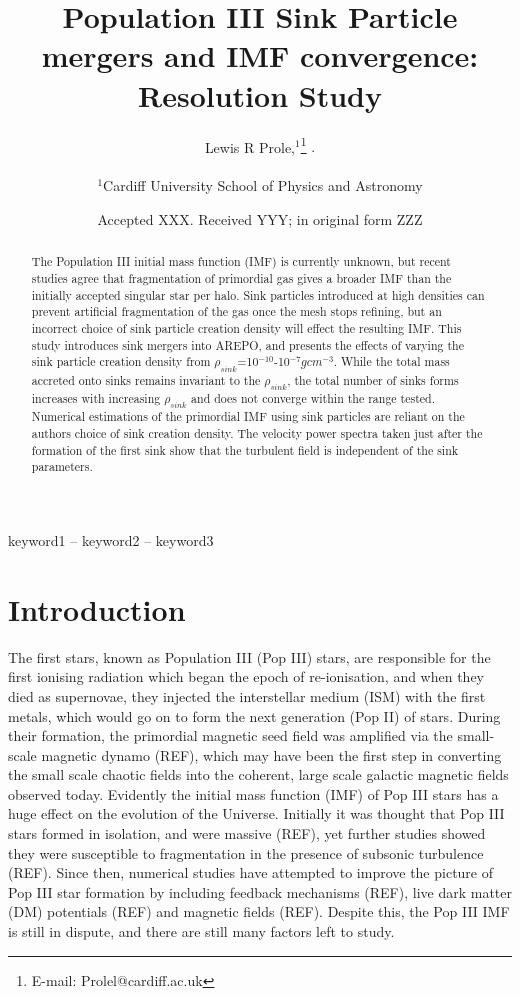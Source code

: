 \documentclass[fleqn,usenatbib]{mnras}
\title[Short title, max. 45 characters]{Population III Sink Particle mergers and IMF convergence: Resolution Study}
\author[L. R. Prole]{
Lewis R Prole,$^{1}$\thanks{E-mail: Prolel@cardiff.ac.uk}
$.$
$$
$$
\\
$^{1}$Cardiff University School of Physics and Astronomy\\
$$
$$
}
\date{Accepted XXX. Received YYY; in original form ZZZ}
\begin{document}
\label{firstpage}
\pagerange{\pageref{firstpage}--\pageref{lastpage}}
\maketitle

\begin{abstract}
The Population III initial mass function (IMF) is currently unknown, but recent studies agree that fragmentation of primordial gas gives a broader IMF than the initially accepted singular star per halo. Sink particles introduced at high densities can prevent artificial fragmentation of the gas once the mesh stops refining, but an incorrect choice of sink particle creation density will effect the resulting IMF. This study introduces sink mergers into AREPO, and presents the effects of varying the sink particle creation density from $\rho_{sink}$=10$^{-10}$-10$^{-7}gcm^{-3}$. While the total mass accreted onto sinks remains invariant to the $\rho_{sink}$, the total number of sinks forms increases with increasing $\rho_{sink}$ and does not converge within the range tested. Numerical estimations of the primordial IMF using sink particles are reliant on the authors choice of sink creation density. The velocity power spectra taken just after the formation of the first sink show that the turbulent field is independent of the sink parameters. 
\end{abstract}

\begin{keywords}
keyword1 -- keyword2 -- keyword3
\end{keywords}



\section{Introduction}
The first stars, known as Population III (Pop III) stars, are responsible for the first ionising radiation which began the epoch of re-ionisation, and when they died as supernovae, they injected the interstellar medium (ISM) with the first metals, which would go on to form the next generation (Pop II) of stars. During their formation, the primordial magnetic seed field was amplified via the small-scale magnetic dynamo (REF), which may have been the first step in converting the small scale chaotic fields into the coherent, large scale galactic magnetic fields observed today. Evidently the initial mass function (IMF) of Pop III stars has a huge effect on the evolution of the Universe. Initially it was thought that Pop III stars formed in isolation, and were massive (REF), yet further studies showed they were susceptible to fragmentation in the presence of subsonic turbulence (REF). Since then, numerical studies have attempted to improve the picture of Pop III star formation by including feedback mechanisms (REF), live dark matter (DM) potentials (REF) and magnetic fields (REF). Despite this, the Pop III IMF is still in dispute, and there are still many factors left to study.
\end{document}

